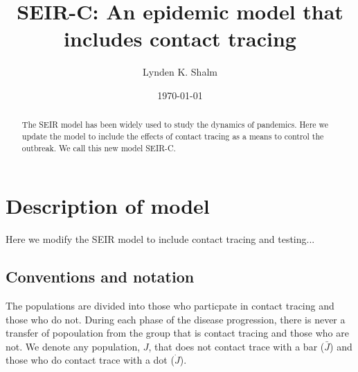 \documentclass[notitlepage, superscriptaddress]{revtex4-2}
\begin{document}
\title{SEIR-C: An epidemic model that includes contact tracing}

\author{Lynden K. Shalm}



\begin{abstract}
The SEIR model has been widely used to study the dynamics of pandemics. Here we update the model to include the effects of contact tracing as a means to control the outbreak. We call this new model SEIR-C.
\end{abstract}
\date{\today}
\maketitle



\section{Description of model}
Here we modify the SEIR model to include contact tracing and testing...

\subsection{Conventions and notation}
The populations are divided into those who particpate in contact tracing and those who do not. During each phase of the disease progression, there is never a transfer of popoulation from the group that is contact tracing and those who are not. We denote any population, $J$, that does not contact trace with a bar ($\bar{J}$) and those who do contact trace with a dot ($\dot{J}$). 
\end{document}
